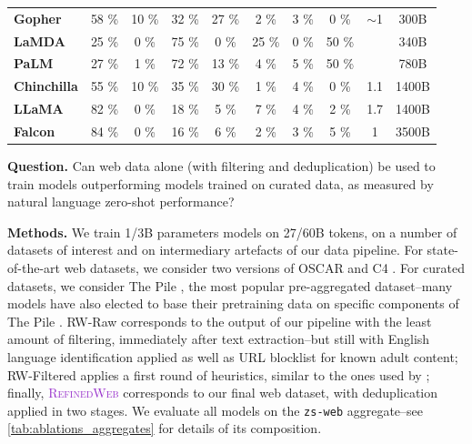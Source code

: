 \documentclass{article}
\DeclareRobustCommand{\data}[1]{\textcolor{DarkOrchid}{#1}}
\begin{document}
\begin{table}[b]
\begin{small}
\begin{tabular}{lccccccccc}
\textbf{Gopher}     & 58 \%        & 10 \%                & 32 \%            & 27 \%         & 2 \%      & 3 \%          & 0 \%          & $\sim$1                        & 300B            \\
\textbf{LaMDA}      & 25 \%        & 0 \%        & 75 \%            & 0 \% & 25 \%     &  0 \% & 50 \%         &            & 340B           \\
\textbf{PaLM}       & 27 \%        & 1 \%                 & 72 \%            & 13 \%         & 4 \%      & 5 \%          & 50 \%         &                             & 780B            \\ \midrule
\textbf{Chinchilla} & 55 \%        & 10 \%                & 35 \%            & 30 \%         & 1 \%      & 4 \%          & 0 \%          & 1.1                        & 1400B           \\
\textbf{LLaMA}      & 82 \%        & 0 \%                 & 18 \%            & 5 \%        & 7 \%      & 4 \%        & 2 \%          & 1.7                        & 1400B           \\
\textbf{Falcon}     & 84 \%        & 0 \%                 & 16 \%            & 6 \%          & 2 \%      & 3 \%          & 5 \%          & 1                           & 3500B   \\       
\bottomrule
\end{tabular}
\end{small}
\end{table}

\smallskip

\begin{mdframed}[style=side]
\textbf{Question.} Can web data alone (with filtering and deduplication) be used to train models outperforming models trained on curated data, as measured by natural language zero-shot performance?
\end{mdframed}
\vspace{-0.1in}

\textbf{Methods.} We train 1/3B parameters models on 27/60B tokens, on a number of datasets of interest and on intermediary artefacts of our data pipeline. For state-of-the-art web datasets, we consider two versions of OSCAR \citep{ortiz2019oscar, oscar_new} and C4 \citep{raffel2019t5}. For curated datasets, we consider The Pile \citep{gao2020pile}, the most popular pre-aggregated dataset--many models have also elected to base their pretraining data on specific components of The Pile \citep{smith2022using, zhang2022opt}. RW-Raw corresponds to the output of our pipeline with the least amount of filtering, immediately after text extraction--but still with English language identification applied as well as URL blocklist for known adult content; RW-Filtered applies a first round of heuristics, similar to the ones used by \citet{gopher}; finally, \data{\textsc{RefinedWeb}} corresponds to our final web dataset, with deduplication applied in two stages. We evaluate all models on the \texttt{zs-web} aggregate--see \cref{tab:ablations_aggregates} for details of its composition.
\end{document}
